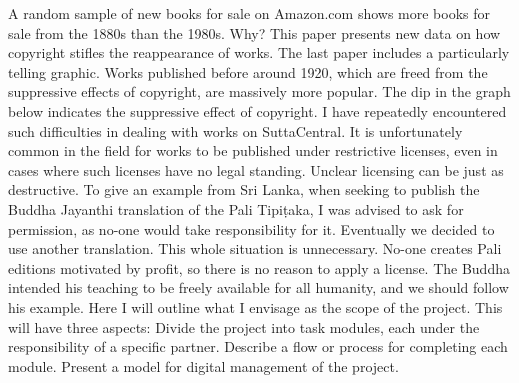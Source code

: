 {}\markdownRendererBlockQuoteBegin
A random sample of new books for sale on Amazon.com shows more books for sale from the 1880s than the 1980s. Why? This paper presents new data on how copyright stifles the reappearance of works.
\markdownRendererBlockQuoteEnd \markdownRendererInterblockSeparator
{}The last paper includes a particularly telling graphic. Works published before around 1920, which are freed from the suppressive effects of copyright, are massively more popular. The dip in the graph below indicates the suppressive effect of copyright.\markdownRendererInterblockSeparator
{}\markdownRendererInterblockSeparator
{}I have repeatedly encountered such difficulties in dealing with works on SuttaCentral. It is unfortunately common in the field for works to be published under restrictive licenses, even in cases where such licenses have no legal standing. Unclear licensing can be just as destructive. To give an example from Sri Lanka, when seeking to publish the Buddha Jayanthi translation of the Pali Tipiṭaka, I was advised  to ask for permission, as no-one would take responsibility for it. Eventually we decided to use another translation.\markdownRendererInterblockSeparator
{}This whole situation is unnecessary. No-one creates Pali editions motivated by profit, so there is no reason to apply a license. The Buddha intended his teaching to be freely available for all humanity, and we should follow his example.\markdownRendererInterblockSeparator
{}\markdownRendererBlockQuoteBegin
{}
\markdownRendererBlockQuoteEnd \markdownRendererInterblockSeparator
{}\markdownRendererInterblockSeparator
{}Here I will outline what I envisage as the scope of the project. This will have three aspects:\markdownRendererInterblockSeparator
{}\markdownRendererUlBegin
\markdownRendererUlItem Divide the project into task modules, each under the responsibility of a specific partner.\markdownRendererUlItemEnd 
\markdownRendererUlItem Describe a flow or process for completing each module.\markdownRendererUlItemEnd 
\markdownRendererUlItem Present a model for digital management of the project.\markdownRendererUlItemEnd 
\markdownRendererUlEnd \markdownRendererInterblockSeparator
{}\markdownRendererInterblockSeparator
